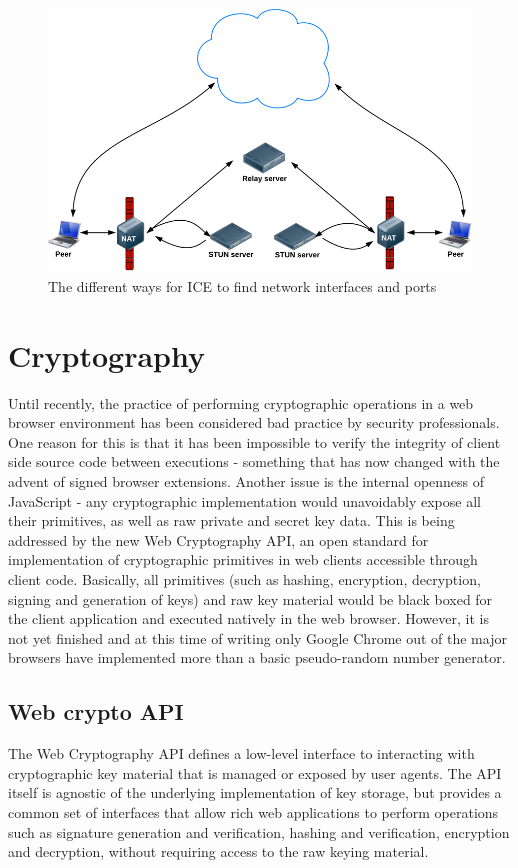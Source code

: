 \begin{figure}[htp]
\centering
\includegraphics[width=\textwidth,height=0.25\paperheight,keepaspectratio
]{figures/ICE}
\caption{The different ways for ICE to find network interfaces and ports \cite{WebRTCBasics:2012:Online}}
\label{fig:ICE}
\end{figure}

\section{Cryptography}
Until recently, the practice of performing cryptographic operations in a web browser environment has been considered bad practice by security professionals\cite{Matasano:Online}. One reason for this is that it has been impossible to verify the integrity of client side source code between executions - something that has now changed with the advent of signed browser extensions. Another issue is the internal openness of JavaScript - any cryptographic implementation would unavoidably expose all their primitives, as well as raw private and secret key data. This is being addressed by the new Web Cryptography API\cite{WebCrypto:Online}, an open standard for implementation of cryptographic primitives in web clients accessible through client code. Basically, all primitives (such as hashing, encryption, decryption, signing and generation of keys) and raw key material would be black boxed for the client application and executed natively in the web browser. However, it is not yet finished and at this time of writing only Google Chrome out of the major browsers have implemented more than a basic pseudo-random number generator.
\subsection{Web crypto API}
The Web Cryptography API defines a low-level interface to interacting with cryptographic key material that is managed or exposed by user agents. The API itself is agnostic of the underlying implementation of key storage, but provides a common set of interfaces that allow rich web applications to perform operations such as signature generation and verification, hashing and verification, encryption and decryption, without requiring access to the raw keying material.
